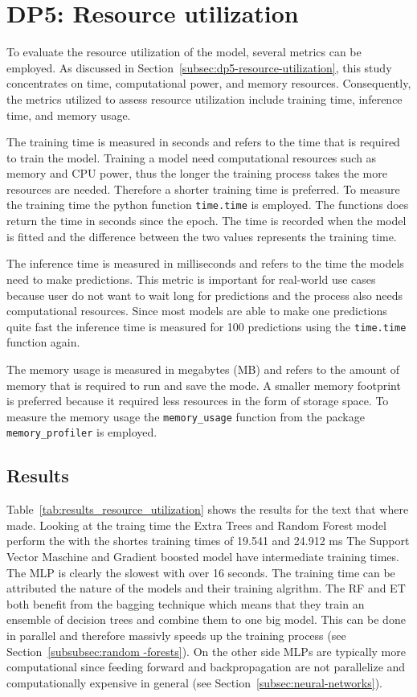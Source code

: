 \section{DP5: Resource utilization}\label{sec:resource-utilization}

To evaluate the resource utilization of the model, several metrics can be employed.
As discussed in Section~\ref{subsec:dp5-resource-utilization}, this study concentrates on time, computational power,
and memory resources.
Consequently, the metrics utilized to assess resource utilization include training time, inference time, and memory
usage.

The training time is measured in seconds and refers to the time that is required to train the model.
Training a model need computational resources such as memory and CPU power, thus the longer the training process
takes the more resources are needed.
Therefore a shorter training time is preferred.
To measure the training time the python function \texttt{time.time} is employed.
The functions does return the time in seconds since the epoch.
The time is recorded when the model is fitted and the difference between the two values
represents the training time.

The inference time is measured in milliseconds and refers to the time the models need to make predictions.
This metric is important for real-world use cases because user do not want to wait long for predictions and the
process also needs computational resources.
Since most models are able to make one predictions quite fast the inference time is measured for 100 predictions
using the \texttt{time.time} function again.

The memory usage is measured in megabytes (MB) and refers to the amount of memory that is required to run and save
the mode.
A smaller memory footprint is preferred because it required less resources in the form of storage space.
To measure the memory usage the \texttt{memory\_usage} function from the package \texttt{memory\_profiler} is
employed.

\subsection*{Results}

Table~\ref{tab:results_resource_utilization} shows the results for the text that where made.
Looking at the traing time the Extra Trees and Random Forest model perform the with the shortes training times
of 19.541 and 24.912 ms
The Support Vector Maschine and Gradient boosted model have intermediate training times.
The MLP is clearly the slowest with over 16 seconds.
The training time can be attributed the nature of the models and their training algrithm.
The RF and ET both benefit from the bagging technique which means that they train an ensemble of decision trees and
combine them to one big model.
This can be done in parallel and therefore massivly speeds up the training
process (see Section~\ref{subsubsec:random -forests}).
On the other side MLPs are typically more computational since feeding forward and backpropagation are not
parallelize and computationally expensive in general (see Section~\ref{subsec:neural-networks}).

